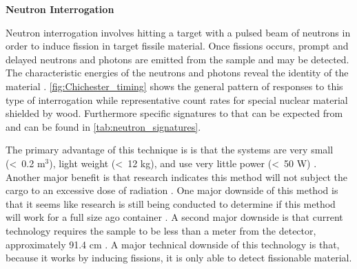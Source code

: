 \documentclass{report}
\begin{document}





\textbf{Neutron Interrogation}

Neutron interrogation involves hitting a target with a pulsed beam of neutrons in order to induce fission in target fissile material. Once fissions occurs, prompt and delayed neutrons and photons are emitted from the sample and may be detected. The characteristic energies of the neutrons and photons reveal the identity of the material \cite{Chichester2009}.  \autoref{fig:Chichester_timing}  shows the general pattern of responses to this type of interrogation while representative count rates for special nuclear material shielded by wood. Furthermore specific signatures to that can be expected from  and  can be found in \autoref{tab:neutron_signatures}.

The primary advantage of this technique is is that the systems are very small (\textless\ 0.2 m\(^3\)), light weight (\textless\ 12 kg), and use very little power (\textless\ 50 W) \cite{Chichester2009}.  Another major benefit is that research indicates this method will not subject the cargo to an excessive dose of radiation \cite{Hall2007}.  One major downside of this method is that it seems like research is still being conducted to determine if this method will work for a full size ago container \cite{Hall2007}.  A second major downside is that current technology requires the sample to be less than a meter from the detector, approximately 91.4 cm \cite{Hall2007}. A major technical downside of this technology is that, because it works by inducing fissions, it is only able to detect fissionable material.
\end{document}
